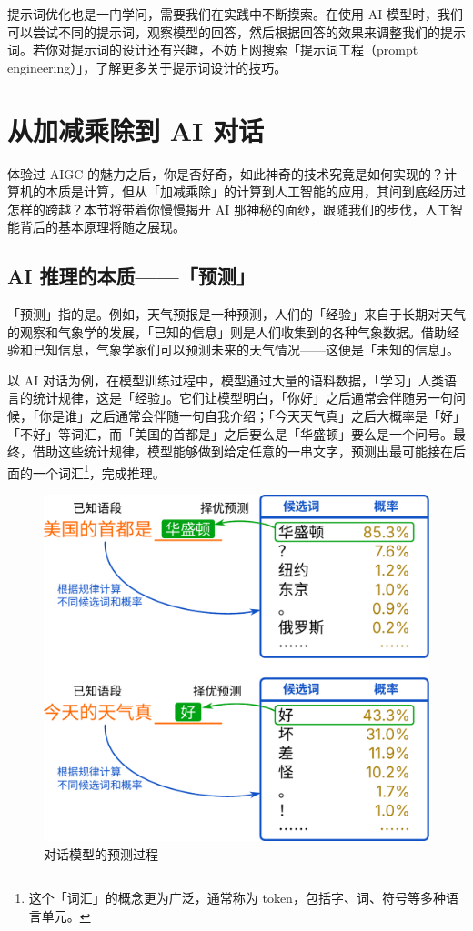 提示词优化也是一门学问，需要我们在实践中不断摸索。在使用 AI 模型时，我们可以尝试不同的提示词，观察模型的回答，然后根据回答的效果来调整我们的提示词。若你对提示词的设计还有兴趣，不妨上网搜索「提示词工程（prompt engineering）」，了解更多关于提示词设计的技巧。

\section{从加减乘除到 AI 对话}

体验过 AIGC 的魅力之后，你是否好奇，如此神奇的技术究竟是如何实现的？计算机的本质是计算，但从「加减乘除」的计算到人工智能的应用，其间到底经历过怎样的跨越？本节将带着你慢慢揭开 AI 那神秘的面纱，跟随我们的步伐，人工智能背后的基本原理将随之展现。

\subsection{AI 推理的本质——「预测」}

「预测」指的是。例如，天气预报是一种预测，人们的「经验」来自于长期对天气的观察和气象学的发展，「已知的信息」则是人们收集到的各种气象数据。借助经验和已知信息，气象学家们可以预测未来的天气情况——这便是「未知的信息」。

以 AI 对话为例，在模型训练过程中，模型通过大量的语料数据，「学习」人类语言的统计规律，这是「经验」。它们让模型明白，「你好」之后通常会伴随另一句问候，「你是谁」之后通常会伴随一句自我介绍；「今天天气真」之后大概率是「好」「不好」等词汇，而「美国的首都是」之后要么是「华盛顿」要么是一个问号。最终，借助这些统计规律，模型能够做到给定任意的一串文字，预测出最可能接在后面的一个词汇\footnote{这个「词汇」的概念更为广泛，通常称为 token，包括字、词、符号等多种语言单元。}，完成推理。

\begin{figure}[htb!]
  \centering
  \includegraphics[width=.6\textwidth]{assets/surpass/GPT_is_predicting.pdf}
  \caption{对话模型的预测过程}
  \label{fig:GPT_is_predicting}
\end{figure}

